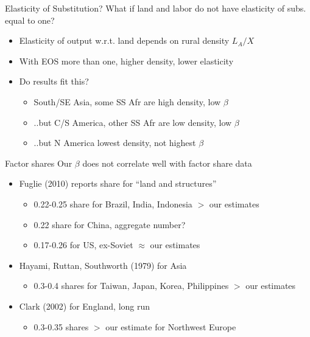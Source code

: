 \documentclass[10pt, xcolor=dvipsnames]{beamer}
\begin{document}
\begin{frame}{Elasticity of Substitution?}\label{eos}
What if land and labor do not have elasticity of subs. equal to one?
\begin{itemize}
  \item Elasticity of output w.r.t. land depends on rural density $L_A/X$
  \item With EOS more than one, higher density, lower elasticity
  \item Do results fit this?
  \begin{itemize}
    \item South/SE Asia, some SS Afr are high density, low $\beta$
    \item ..but C/S America, other SS Afr are low density, low $\beta$
    \item ..but N America lowest density, not highest $\beta$
  \end{itemize}
\end{itemize}
\hfill \hyperlink{rurdbeta}{}
\end{frame}

\begin{frame}{Factor shares}
Our $\beta$ does not correlate well with factor share data
\begin{itemize}
  \item Fuglie (2010) reports share for ``land and structures''
  \begin{itemize}
    \item 0.22-0.25 share for Brazil, India, Indonesia $>$ our estimates
    \item 0.22 share for China, aggregate number?
    \item 0.17-0.26 for US, ex-Soviet $\approx$ our estimates
  \end{itemize}
  \item Hayami, Ruttan, Southworth (1979) for Asia
    \begin{itemize}
      \item 0.3-0.4 shares for Taiwan, Japan, Korea, Philippines $>$ our estimates
    \end{itemize}
  \item Clark (2002) for England, long run
    \begin{itemize}
      \item 0.3-0.35 shares $>$ our estimate for Northwest Europe
    \end{itemize}
\end{itemize}
\end{frame}
\end{document}
